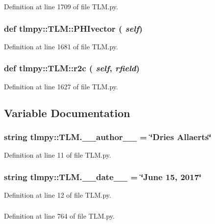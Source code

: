 Definition at line 1709 of file TLM.py.\hypertarget{namespacetlmpy_1_1TLM_a557ba52a14aa64f4fae85e9bb8c707bd}{
\subsubsection[{PHIvector}]{\setlength{\rightskip}{0pt plus 5cm}def tlmpy::TLM::PHIvector ( {\em self})}}
\label{namespacetlmpy_1_1TLM_a557ba52a14aa64f4fae85e9bb8c707bd}


Definition at line 1681 of file TLM.py.\hypertarget{namespacetlmpy_1_1TLM_ad481b8522594a40d275088b12e94a4af}{
\subsubsection[{r2c}]{\setlength{\rightskip}{0pt plus 5cm}def tlmpy::TLM::r2c ( {\em self}, \/   {\em rfield})}}
\label{namespacetlmpy_1_1TLM_ad481b8522594a40d275088b12e94a4af}


Definition at line 1627 of file TLM.py.

\subsection{Variable Documentation}
\hypertarget{namespacetlmpy_1_1TLM_ab23e017eca5e365335146c0a949c96b4}{
\subsubsection[{\_\-\_\-author\_\-\_\-}]{\setlength{\rightskip}{0pt plus 5cm}string {\bf tlmpy::TLM.\_\-\_\-author\_\-\_\-} = \char`\"{}Dries Allaerts\char`\"{}}}
\label{namespacetlmpy_1_1TLM_ab23e017eca5e365335146c0a949c96b4}


Definition at line 11 of file TLM.py.\hypertarget{namespacetlmpy_1_1TLM_a8d29aed8107082d94640e02031d67613}{
\subsubsection[{\_\-\_\-date\_\-\_\-}]{\setlength{\rightskip}{0pt plus 5cm}string {\bf tlmpy::TLM.\_\-\_\-date\_\-\_\-} = \char`\"{}June 15, 2017\char`\"{}}}
\label{namespacetlmpy_1_1TLM_a8d29aed8107082d94640e02031d67613}


Definition at line 12 of file TLM.py.\hypertarget{namespacetlmpy_1_1TLM_afc92ced32a0ad7707d14d146ec8eea02}{
\subsubsection[{PHI}]{}}
\label{namespacetlmpy_1_1TLM_afc92ced32a0ad7707d14d146ec8eea02}


Definition at line 764 of file TLM.py.